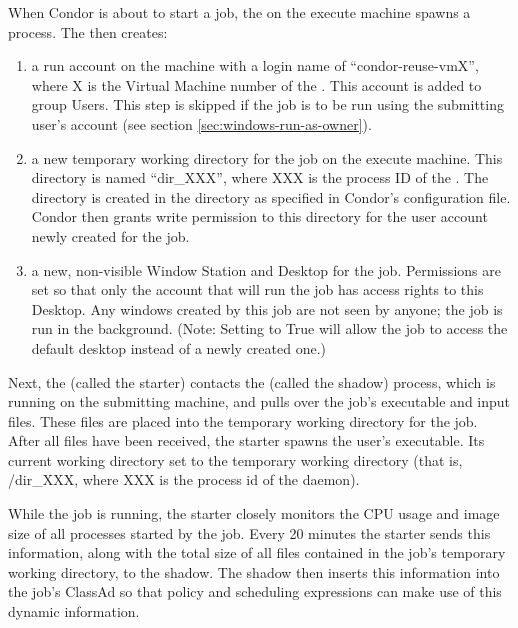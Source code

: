 When Condor is about to start a job, the  on the execute
machine spawns a  process.  The  then
creates:
\begin{enumerate}

\item a run account on the machine with a login name of
``condor-reuse-vmX'', where X is the Virtual Machine number of the
.  This account is added to group Users.  This step is
skipped if the job is to be run using the submitting user's account
(see section \ref{sec:windows-run-as-owner}).

\item a new temporary working directory for the job on the execute machine.
This directory is
named ``dir\_XXX'', where XXX is the process ID of the .
The directory is created in the  directory as
specified in Condor's configuration file.  Condor then grants write
permission to this directory for the user account newly created for the
job.

\item a new, non-visible Window Station and Desktop for the job.
Permissions are set so that only the account that will run the job has
access rights to this Desktop.  Any windows created by this job are
not seen by anyone; the job is run in the background.  (Note: Setting
 to True will allow the job to access the
default desktop instead of a newly created one.)

\end{enumerate}

Next, the  (called the starter) contacts the
 (called the shadow) process, which is running on the
submitting machine, and pulls over the job's executable and input
files.  These files are placed into the temporary working directory
for the job.  After all files have been received, the starter spawns
the user's executable.  Its current working directory set to the
temporary working directory (that is, /dir\_XXX,
where XXX is the process id of the  daemon).

While the job is running, the starter closely monitors the CPU
usage and image size of all processes started by the job.
Every 20 minutes the starter sends this information,
along with the total size of all files contained in the job's
temporary working directory, to the shadow.
The shadow then
inserts this information into the job's ClassAd so that policy and
scheduling expressions can make use of this dynamic information.

